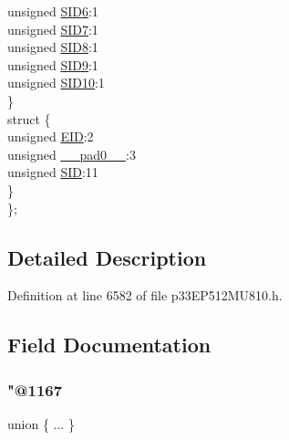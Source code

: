 \begin{DoxyCompactItemize}
\begin{tabbing}
\>\>unsigned \hyperlink{structtag_c2_r_x_f7_s_i_d_b_i_t_s_a70d70952133eb2389d5c326f9f0e8035}{SID6}:1\\
\>\>unsigned \hyperlink{structtag_c2_r_x_f7_s_i_d_b_i_t_s_a34097fb76decd431701fa2d86a22328e}{SID7}:1\\
\>\>unsigned \hyperlink{structtag_c2_r_x_f7_s_i_d_b_i_t_s_afe74894633244fdb0b0c01b4e8c522e7}{SID8}:1\\
\>\>unsigned \hyperlink{structtag_c2_r_x_f7_s_i_d_b_i_t_s_a33587704948067005c2a6a3ccc503c99}{SID9}:1\\
\>\>unsigned \hyperlink{structtag_c2_r_x_f7_s_i_d_b_i_t_s_a1a9084031c7f5fb16007feeebf0d8216}{SID10}:1\\
\>\} \\
\>struct \{\\
\>\>unsigned \hyperlink{structtag_c2_r_x_f7_s_i_d_b_i_t_s_ae80b378c9141f7c03e0b4e55b5f4b54d}{EID}:2\\
\>\>unsigned \hyperlink{structtag_c2_r_x_f7_s_i_d_b_i_t_s_adf71f3d8410c1f1dbbc96680a92c49af}{\_\_pad0\_\_}:3\\
\>\>unsigned \hyperlink{structtag_c2_r_x_f7_s_i_d_b_i_t_s_af88edf93b2fee2432665bd84f51287e4}{SID}:11\\
\>\} \\
\}; \\

\end{tabbing}\end{DoxyCompactItemize}


\subsection{Detailed Description}


Definition at line 6582 of file p33\+E\+P512\+M\+U810.\+h.



\subsection{Field Documentation}
\mbox{\label{structtag_c2_r_x_f7_s_i_d_b_i_t_s_a062718a3244e85e82b991de28531818a}} 
\subsubsection{\texorpdfstring{"@1167}{@1167}}
{\footnotesize\ttfamily union \{ ... \} }

\mbox{\label{structtag_c2_r_x_f7_s_i_d_b_i_t_s_adf71f3d8410c1f1dbbc96680a92c49af}} 
